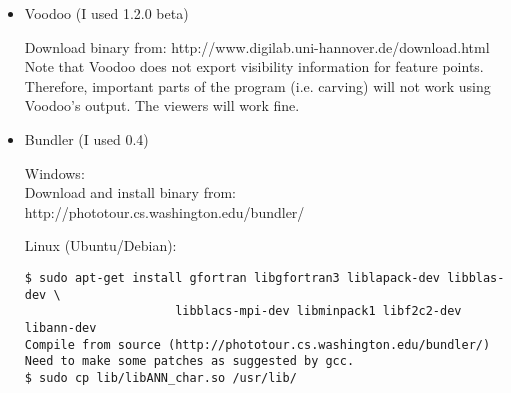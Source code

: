 \begin{enumerate}
\begin{itemize}
   \item Voodoo (I used 1.2.0 beta)

        Download binary from:
        http://www.digilab.uni-hannover.de/download.html \\

        Note that Voodoo does not export visibility information for feature points.
        Therefore, important parts of the program (i.e. carving) will not work using
        Voodoo's output. The viewers will work fine.

   \item Bundler (I used 0.4)

        Windows: \\
          Download and install binary from: http://phototour.cs.washington.edu/bundler/

        Linux (Ubuntu/Debian):
        \begin{verbatim}
$ sudo apt-get install gfortran libgfortran3 liblapack-dev libblas-dev \
                     libblacs-mpi-dev libminpack1 libf2c2-dev libann-dev
Compile from source (http://phototour.cs.washington.edu/bundler/)
Need to make some patches as suggested by gcc.
$ sudo cp lib/libANN_char.so /usr/lib/
        \end{verbatim}

   \end{itemize}

\end{enumerate}

